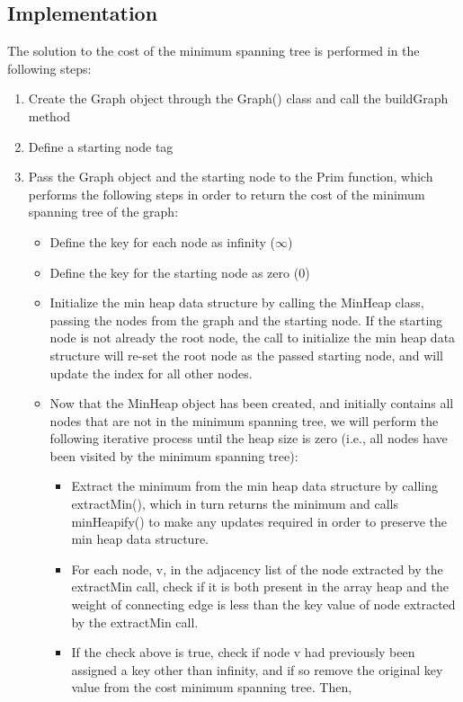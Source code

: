 \subsection{Implementation}
The solution to the cost of the minimum spanning tree is performed in the following steps:
\begin{enumerate}
    \item Create the Graph object through the Graph() class and call the buildGraph method
    \item Define a starting node tag
    \item Pass the Graph object and the starting node to the Prim function, which performs the following steps in order to return the cost of the minimum spanning tree of the graph:
    \begin{itemize}
    	\item Define the key for each node as infinity ($\infty$)
    	\item Define the key for the starting node as zero (0) 
    	\item Initialize the min heap data structure by calling the MinHeap class, passing the nodes from the graph and the starting node. If the starting node is not already the root node, the call to initialize the min heap data structure will re-set the root node as the passed starting node, and will update the index for all other nodes.
    	\item Now that the MinHeap object has been created, and initially contains all nodes that are not in the minimum spanning tree, we will perform the following iterative process until the heap size is zero (i.e., all nodes have been visited by the minimum spanning tree):
    	\begin{itemize}
    	    \item Extract the minimum from the min heap data structure by calling extractMin(), which in turn returns the minimum and calls minHeapify() to make any updates required in order to preserve the min heap data structure. 
    	    \item For each node, v, in the adjacency list of the node extracted by the extractMin call, check if it is both present in the array heap and the weight of connecting edge is less than the key value of node extracted by the extractMin call.
    	    \item If the check above is true, check if node v had previously been assigned a key other than infinity, and if so remove the original key value from the cost minimum spanning tree. Then, 
    	    \begin{enumerate}

\end{enumerate}
\end{itemize}
\end{itemize}
\end{enumerate}
